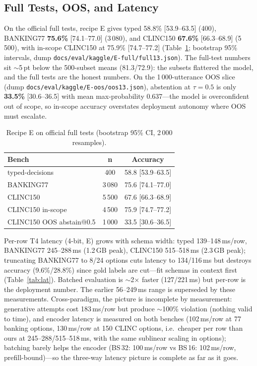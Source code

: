\subsection{Full Tests, OOS, and Latency}
On the official full tests, recipe E gives typed 58.8\% [53.9--63.5] (400),
BANKING77 \textbf{75.6\%} [74.1--77.0] (3\,080), and CLINC150 \textbf{67.6\%}
[66.3--68.9] (5\,500), with in-scope CLINC150 at 75.9\% [74.7--77.2]
(Table~\ref{tab:full}; bootstrap 95\% intervals, dump
\texttt{docs/eval/kaggle/E-full/full13.json}). The full-test numbers sit
$\sim$5\,pt below the 500-subset means (81.3/72.9): the subsets flattered the
model, and the full tests are the honest numbers. On the 1\,000-utterance OOS
slice (dump \texttt{docs/eval/kaggle/E-oos/oos13.json}), abstention at
$\tau{=}0.5$ is only \textbf{33.5\%} [30.6--36.5] with mean max-probability
0.637---the model is overconfident out of scope, so in-scope accuracy
overstates deployment autonomy where OOS must escalate.

\begin{table}[htbp]
\caption{Recipe E on official full tests (bootstrap 95\% CI, 2\,000 resamples).}
\label{tab:full}
\begin{center}
\setlength{\tabcolsep}{4pt}
\begin{small}
\begin{tabular}{lcc}
\toprule
Bench & n & Accuracy \\
\midrule
typed-decisions & 400 & 58.8 [53.9--63.5] \\
BANKING77 & 3\,080 & 75.6 [74.1--77.0] \\
CLINC150 & 5\,500 & 67.6 [66.3--68.9] \\
CLINC150 in-scope & 4\,500 & 75.9 [74.7--77.2] \\
CLINC150 OOS abstain@0.5 & 1\,000 & 33.5 [30.6--36.5] \\
\bottomrule
\end{tabular}
\end{small}
\end{center}
\end{table}

Per-row T4 latency (4-bit, E) grows with schema width: typed 139--148\,ms/row,
BANKING77 245--288\,ms (1.2\,GB peak), CLINC150 515--518\,ms (2.3\,GB peak);
truncating BANKING77 to 8/24 options cuts latency to 134/116\,ms but destroys
accuracy (9.6\%/28.8\%) since gold labels are cut---fit schemas in context
first (Table~\ref{tab:lat}). Batched evaluation is $\sim$2$\times$ faster
(127/221\,ms) but per-row is the deployment number. The earlier 56--249\,ms
range is superseded by these measurements. Cross-paradigm, the picture is
incomplete by measurement: generative attempts cost 183\,ms/row but produce
$\sim$100\% violation (nothing valid to time), and encoder latency is
measured on both benches (102\,ms/row at 77 banking options, 130\,ms/row at
150 CLINC options, i.e.\ cheaper per row than ours at 245--288/515--518\,ms,
with the same sublinear scaling in options); batching barely helps the
encoder (BS\,32: 100\,ms/row vs BS\,16: 102\,ms/row, prefill-bound)---so the
three-way latency picture is complete as far as it goes.

